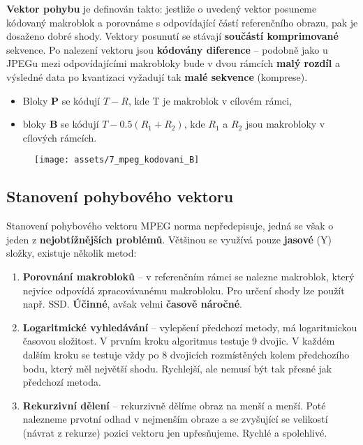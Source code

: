 \textbf{Vektor pohybu} je definován takto: jestliže o uvedený vektor posuneme kódovaný makroblok a porovnáme s odpovídající částí referenčního obrazu, pak je dosaženo dobré shody. Vektory posunutí se stávají \textbf{součástí komprimované} sekvence. Po nalezení vektoru jsou \textbf{kódovány diference} -- podobně jako u JPEGu mezi odpovídajícími makrobloky bude v dvou rámcích \textbf{malý rozdíl} a výsledné data po kvantizaci vyžadují tak \textbf{malé sekvence} (komprese).
\begin{itemize}
    \item Bloky \textbf{P} se kódují $T-R$, kde T je makroblok v cílovém rámci,
    \item bloky \textbf{B} se kódují $T - 0.5 (R_1 + R_2)$, kde $R_1$ a $R_2$ jsou makrobloky v cílových rámcích.
\end{itemize}

\begin{figure}[H]
    \centering
    \texttt{[image: assets/7\_mpeg\_kodovani\_B]}
\end{figure}

\subsection{Stanovení pohybového vektoru}
Stanovení pohybového vektoru MPEG norma nepředepisuje, jedná se však o jeden z \textbf{nejobtížnějších problémů}. Většinou se využívá pouze \textbf{jasové} (Y) složky, existuje několik metod:

\begin{enumerate}
    \item \textbf{Porovnání makrobloků} -- v referenčním rámci se nalezne makroblok, který nejvíce odpovídá zpracovávanému makrobloku. Pro určení shody lze použít např. SSD. \textbf{Účinné}, avšak velmi \textbf{časově náročné}.
    \item \textbf{Logaritmické vyhledávání} -- vylepšení předchozí metody, má logaritmickou časovou složitost. V prvním kroku algoritmus testuje 9 dvojic. V každém dalším kroku se testuje vždy po 8 dvojicích rozmístěných kolem předchozího bodu, který měl největší shodu. Rychlejší, ale nemusí být tak přesné jak předchozí metoda.
    \item \textbf{Rekurzivní dělení} -- rekurzivně dělíme obraz na menší a menší. Poté nalezneme prvotní odhad v nejmenším obraze a se zvyšující se velikostí (návrat z rekurze) pozici vektoru jen upřesňujeme. Rychlé a spolehlivé.
\end{enumerate}

